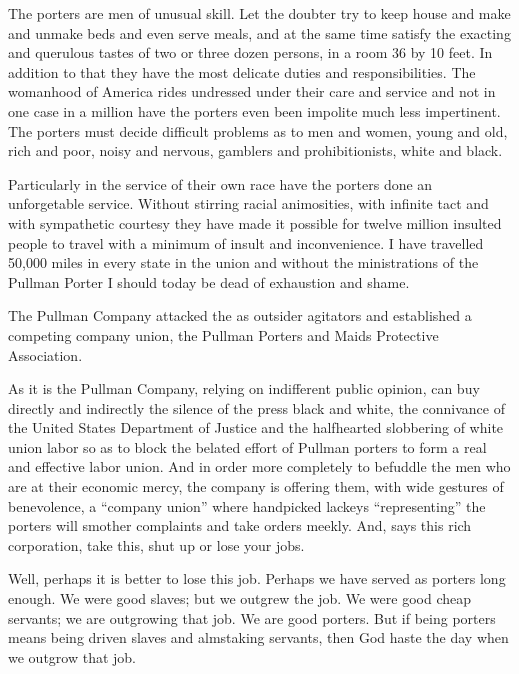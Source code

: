 \documentclass[letterpaper,10pt,english]{jupyterBook}
\begin{document}
\sphinxAtStartPar
The porters are men of unusual skill. Let the doubter try to keep house and make and unmake beds and even serve meals, and at the same time satisfy the exacting and querulous tastes of two or three dozen persons, in a room 36 by 10 feet. In addition to that they have the most delicate duties and responsibilities. The womanhood of America rides undressed under their care and service and not in one case in a million have the porters even been impolite much less impertinent. The porters must decide difficult problems as to men and women, young and old, rich and poor, noisy and nervous, gamblers and prohibitionists, white and black.

\sphinxAtStartPar
Particularly in the service of their own race have the porters done an unforgetable service. Without stirring racial animosities, with infinite tact and with sympathetic courtesy they have made it possible for twelve million insulted people to travel with a minimum of insult and inconvenience. I have travelled 50,000 miles in every state in the union and without the ministrations of the Pullman Porter I should today be dead of exhaustion and shame.

\begin{sphinxShadowBox}
\sphinxstylesidebartitle{}

\sphinxAtStartPar
The Pullman Company attacked the  as outsider agitators and established a competing company union, the Pullman Porters and Maids Protective Association.
\end{sphinxShadowBox}

\sphinxAtStartPar
As it is the Pullman Company, relying on indifferent public opinion, can buy directly and indirectly the silence of the press black and white, the connivance of the United States Department of Justice and the halfhearted slobbering of white union labor so as to block the belated effort of Pullman porters to form a real and effective labor union. And in order more completely to befuddle the men who are at their economic mercy, the company is offering them, with wide gestures of benevolence, a “company union” where hand\sphinxhyphen{}picked lackeys “representing” the porters will smother complaints and take orders meekly. And, says this rich corporation, take this, shut up or lose your jobs.

\sphinxAtStartPar
Well, perhaps it is better to lose this job. Perhaps we have served as porters long enough. We were good slaves; but we outgrew the job. We were good cheap servants; we are outgrowing that job. We are good porters. But if being porters means being driven slaves and alms\sphinxhyphen{}taking servants, then God haste the day when we outgrow that job.
\end{document}
